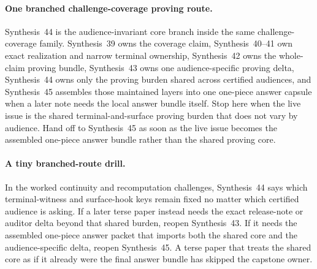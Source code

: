 \documentclass[11pt]{article}
\begin{document}
\paragraph{One branched challenge-coverage proving route.}
Synthesis~44 is the audience-invariant core branch inside the same challenge-coverage family. Synthesis~39 owns the coverage claim, Synthesis~40--41 own exact realization and narrow terminal ownership, Synthesis~42 owns the whole-claim proving bundle, Synthesis~43 owns one audience-specific proving delta, Synthesis~44 owns only the proving burden shared across certified audiences, and Synthesis~45 assembles those maintained layers into one one-piece answer capsule when a later note needs the local answer bundle itself. Stop here when the live issue is the shared terminal-and-surface proving burden that does not vary by audience. Hand off to Synthesis~45 as soon as the live issue becomes the assembled one-piece answer bundle rather than the shared proving core.

\paragraph{A tiny branched-route drill.}
In the worked continuity and recomputation challenges, Synthesis~44 says which terminal-witness and surface-hook keys remain fixed no matter which certified audience is asking. If a later terse paper instead needs the exact release-note or auditor delta beyond that shared burden, reopen Synthesis~43. If it needs the assembled one-piece answer packet that imports both the shared core and the audience-specific delta, reopen Synthesis~45. A terse paper that treats the shared core as if it already were the final answer bundle has skipped the capstone owner.
\end{document}
